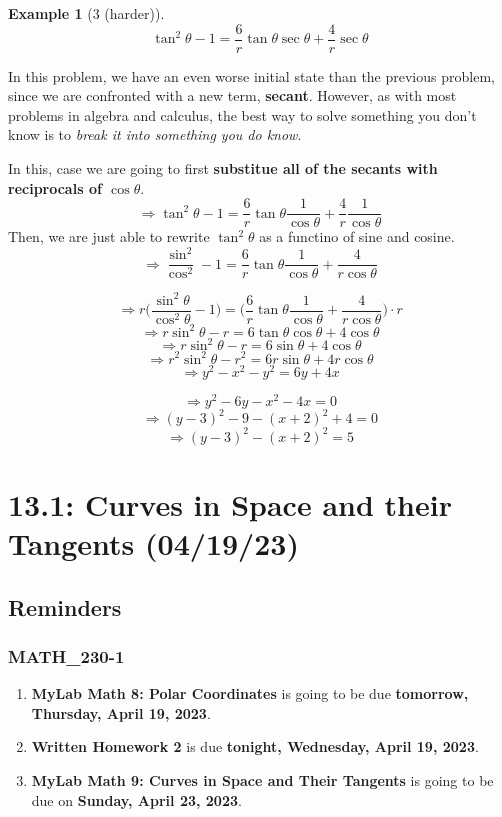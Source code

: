 \documentclass{report}
\newtheorem*{remark*}{Example}
\begin{document}
\begin{sloppypar}
\begin{enumerate}
\end{enumerate}

\begin{remark*}[3 (harder)]
  \[ \tan^{2}{\theta} - 1 = \frac{6}{r}\tan{\theta}\sec{\theta}
    + \frac{4}{r}\sec{\theta} \]
\end{remark*}

In this problem, we have an even
worse initial state than the previous
problem, since we are confronted
with a new term, \textbf{secant}.
However, as with most problems in algebra
and calculus, the best way to solve
something you don't know is to
\textit{break it into something you do
  know}.
\par In this, case we are going to first
\textbf{substitue all of the secants with
  reciprocals of $ \cos{\theta}$}.
\[ \Rightarrow \tan^{2}{\theta} - 1 = \frac{6}{r}\tan{\theta}
  \frac{1}{\cos{\theta}} + \frac{4}{r} \frac{1}{\cos{\theta}
  }\]
Then, we are just able to rewrite
$ \tan^{2}{\theta}$ as a functino of
sine and cosine.
\[ \Rightarrow \frac{\sin^{2}}{\cos^{2}} - 1
  = \frac{6}{r}\tan{\theta}\frac{1}{\cos{\theta}}+\frac{4}{r\cos{\theta}}\]

\[ \Rightarrow r \Biggr( \frac{\sin^{2}{\theta}}{\cos^{2}{\theta}}
    -1 \Biggr) = \Biggr( \frac{6}{r}\tan{\theta}\frac{1}{\cos{\theta}}
    + \frac{4}{r\cos{\theta}}\Biggr) \cdot r
\]
\[ \Rightarrow
  r\sin^{2}{\theta} - r = 6\tan{\theta}\cos{\theta} + 4\cos{\theta}
\]
\[ \Rightarrow r\sin^{2}{\theta} - r
  = 6\sin{\theta} + 4\cos{\theta}\]
\[ \Rightarrow r^{2}\sin^{2}{\theta} - r^{2}
  = 6r\sin{\theta} + 4r\cos{\theta}\]
\[ \Rightarrow y^{2} - x^{2} - y^{2} = 6y + 4x \]

\[ \Rightarrow y^{2} - 6y -x^{2} - 4x = 0 \]
\[ \Rightarrow (y-3)^{2} -9 - (x+2)^{2} + 4 = 0 \]
\[ \Rightarrow (y-3)^{2} - (x+2)^{2} = 5 \]
\chapter{13.1: Curves in Space and their Tangents (04/19/23)}
\section{Reminders}
\subsection{MATH\_230-1}
\begin{enumerate}
  \item \textbf{MyLab Math 8: Polar Coordinates} is
        going to be due \textbf{tomorrow, Thursday, April
        19, 2023}.
  \item \textbf{Written Homework 2} is due
        \textbf{tonight, Wednesday, April 19, 2023}.
  \item \textbf{MyLab Math 9: Curves in Space
        and Their Tangents} is going to be due
        on \textbf{Sunday, April 23, 2023}.


\end{enumerate}
\end{sloppypar}
\end{document}
